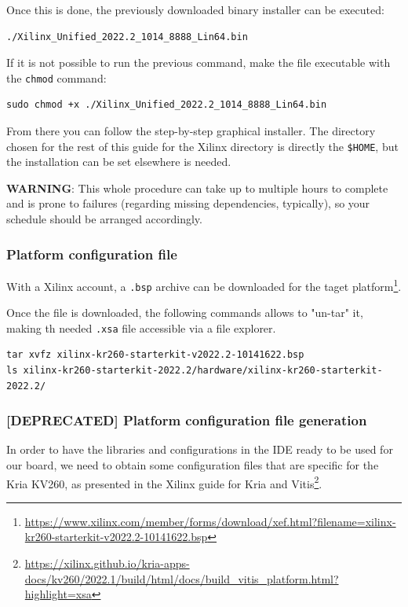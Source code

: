 \documentclass[10pt]{article}
\begin{document}
Once this is done, the previously downloaded binary installer can be executed:

\begin{verbatim}
./Xilinx_Unified_2022.2_1014_8888_Lin64.bin
\end{verbatim}

If it is not possible to run the previous command, make the file executable with the \texttt{chmod} command:

\begin{verbatim}
sudo chmod +x ./Xilinx_Unified_2022.2_1014_8888_Lin64.bin
\end{verbatim}

From there you can follow the step-by-step graphical installer.
The directory chosen for the rest of this guide for the Xilinx directory
is directly the \texttt{\$HOME}, but the installation can be set elsewhere is needed.

\begin{tcolorbox}[colback=orange!5!white,colframe=orange!75!black]
\textbf{WARNING}: This whole procedure can take up to multiple hours to complete
and is prone to failures (regarding missing dependencies, typically),
so your schedule should be arranged accordingly.
\end{tcolorbox}

\subsubsection{Platform configuration file}
\label{sec:org6a025f2}
With a Xilinx account, a \texttt{.bsp} archive can be downloaded for the taget platform\footnote{\url{https://www.xilinx.com/member/forms/download/xef.html?filename=xilinx-kr260-starterkit-v2022.2-10141622.bsp}}.

Once the file is downloaded, the following commands allows to "un-tar" it,
making th needed \texttt{.xsa} file accessible via a file explorer.

\begin{verbatim}
tar xvfz xilinx-kr260-starterkit-v2022.2-10141622.bsp
ls xilinx-kr260-starterkit-2022.2/hardware/xilinx-kr260-starterkit-2022.2/
\end{verbatim}


\subsubsection{[DEPRECATED] Platform configuration file generation}
\label{sec:orgaf3947c}
In order to have the libraries and configurations in the IDE ready to be used for our board,
we need to obtain some configuration files that are specific for the Kria KV260,
as presented in the Xilinx guide for Kria and Vitis\footnote{\url{https://xilinx.github.io/kria-apps-docs/kv260/2022.1/build/html/docs/build\_vitis\_platform.html?highlight=xsa}}.
\end{document}
